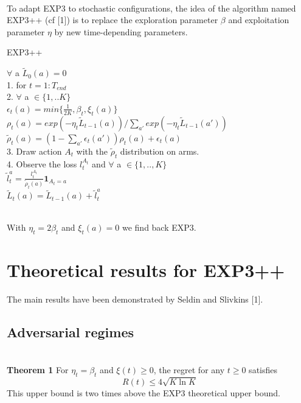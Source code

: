 \documentclass[12pt]{article}
\begin{document}
~\\
To adapt EXP3 to stochastic configurations, the idea of the algorithm named EXP3++ (cf [1]) is to replace the exploration parameter $\beta$ and exploitation parameter $\eta$ by new time-depending parameters.
~\\
\FloatBarrier
\begin{algorithm}
\caption{EXP3++}\label{RS}
$\forall$ a $\tilde{L}_{0}(a)=0$\\
1. for $t=1:T_{end}$~\\
2. $\forall$ a $\in \{1,..K\}$\\
 $\epsilon_{t}(a)=min\{\frac{1}{2K}, \beta_{t}, \xi_{t}(a)\}$ \\
$\rho_{t}(a)=exp(-\eta_{t}\tilde{L}_{t-1}(a))/\sum_{a'}exp(-\eta_{t}\tilde{L}_{t-1}(a'))$\\
$\tilde{\rho}_{t}(a)=(1-\sum_{a'}\epsilon_{t}(a'))\rho_{t}(a)+\epsilon_{t}(a)$\\
3. Draw action $A_{t}$ with the $\tilde{\rho}_{t}$ distribution on arms.~\\
4. Observe the loss $l_{t}^{A_{t}}$ and $\forall$ a $\in \{1,..,K\}$\\
$\tilde{l}_{t}^{a}=\frac{l_{t}^{A_{t}}}{\tilde{\rho}_{t}(a)} \textbf{1}_{A_{t}=a}$\\
$\tilde{L}_{t}(a)=\tilde{L}_{t-1}(a)+\tilde{l}_{t}^{a}$
\end{algorithm}
\FloatBarrier~\\
With $\eta_{t}=2\beta_{t}$ and $\xi_{t}(a)=0$ we find back EXP3.
\section*{Theoretical results for EXP3++}
The main results have been demonstrated by Seldin and Slivkins [1]. 
\subsection*{Adversarial regimes}
~\\
\textbf{Theorem 1} For $\eta_{t}=\beta_{t}$ and $\xi(t) \geq 0$, the regret for any $t\geq0$ satisfies $$R(t) \leq 4\sqrt{K\ln K}$$ This upper bound is two times above the EXP3 theoretical upper bound.~\\
~\\
\end{document}

